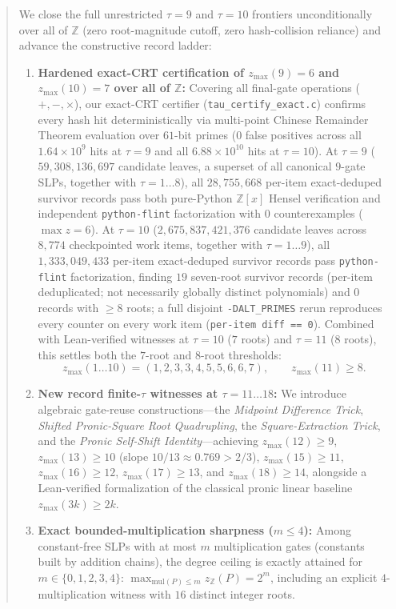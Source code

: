 \documentclass[11pt]{article}
\newcommand{\Z}{\mathbb{Z}}
\newcommand{\code}[1]{\texttt{#1}}
\newcommand{\zmax}{z_{\max}}
\newcommand{\zZ}{z_{\Z}}
\begin{document}
\begin{abstract}
We close the full unrestricted $\tau = 9$ and $\tau = 10$ frontiers unconditionally over all of $\Z$ (zero root-magnitude cutoff, zero hash-collision reliance) and advance the constructive record ladder:
\begin{enumerate}[label=(\arabic*),leftmargin=1.8em]
  \item \textbf{Hardened exact-CRT certification of $\zmax(9) = 6$ and $\zmax(10) = 7$ over all of $\Z$:} Covering all final-gate operations ($+, -, \times$), our exact-CRT certifier (\code{tau\_certify\_exact.c}) confirms every hash hit deterministically via multi-point Chinese Remainder Theorem evaluation over $61$-bit primes ($0$ false positives across all $1.64 \times 10^9$ hits at $\tau = 9$ and all $6.88 \times 10^{10}$ hits at $\tau = 10$). At $\tau = 9$ ($59{,}308{,}136{,}697$ candidate leaves, a superset of all canonical $9$-gate SLPs, together with $\tau = 1 \dots 8$), all $28{,}755{,}668$ per-item exact-deduped survivor records pass both pure-Python $\Z[x]$ Hensel verification and independent \code{python-flint} factorization with $0$ counterexamples ($\max z = 6$). At $\tau = 10$ ($2{,}675{,}837{,}421{,}376$ candidate leaves across $8{,}774$ checkpointed work items, together with $\tau = 1 \dots 9$), all $1{,}333{,}049{,}433$ per-item exact-deduped survivor records pass \code{python-flint} factorization, finding $19$ seven-root survivor records (per-item deduplicated; not necessarily globally distinct polynomials) and $0$ records with $\ge 8$ roots; a full disjoint \code{-DALT\_PRIMES} rerun reproduces every counter on every work item (\code{per-item diff == 0}). Combined with Lean-verified witnesses at $\tau = 10$ ($7$ roots) and $\tau = 11$ ($8$ roots), this settles both the $7$-root and $8$-root thresholds:
  \[
    \zmax(1 \dots 10) = (1, 2, 3, 3, 4, 5, 5, 6, 6, 7), \qquad \zmax(11) \ge 8.
  \]
  \item \textbf{New record finite-$\tau$ witnesses at $\tau = 11 \dots 18$:} We introduce algebraic gate-reuse constructions---the \emph{Midpoint Difference Trick}, \emph{Shifted Pronic-Square Root Quadrupling}, the \emph{Square-Extraction Trick}, and the \emph{Pronic Self-Shift Identity}---achieving $\zmax(12) \ge 9$, $\zmax(13) \ge 10$ (slope $10/13 \approx 0.769 > 2/3$), $\zmax(15) \ge 11$, $\zmax(16) \ge 12$, $\zmax(17) \ge 13$, and $\zmax(18) \ge 14$, alongside a Lean-verified formalization of the classical pronic linear baseline $\zmax(3k) \ge 2k$.
  \item \textbf{Exact bounded-multiplication sharpness ($m \le 4$):} Among constant-free SLPs with at most $m$ multiplication gates (constants built by addition chains), the degree ceiling is exactly attained for $m \in \{0,1,2,3,4\}$: $\max_{\mathrm{mul}(P) \le m} \zZ(P) = 2^m$, including an explicit $4$-multiplication witness with $16$ distinct integer roots.

\end{enumerate}
\end{abstract}
\end{document}
